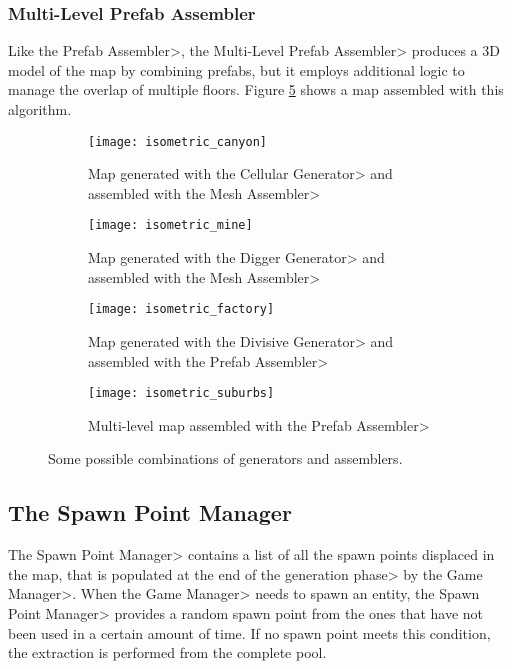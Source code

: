 
\subsubsection{Multi-Level Prefab Assembler}

Like the \<Prefab Assembler>, the \<Multi-Level Prefab Assembler> produces a 3D model of the map by combining prefabs, but it employs additional logic to manage the overlap of multiple floors. Figure \ref{fig:multi_assembled} shows a map assembled with this algorithm.

\begin{figure}
\centering
\begin{subfigure}[t]{0.48\linewidth}
\texttt{[image: isometric\_canyon]}
\caption{Map generated with the \<Cellular Generator> and assembled with the \<Mesh Assembler>}
\label{fig:cellular_assembled}
\end{subfigure}
\hfill
\begin{subfigure}[t]{0.48\linewidth}
\texttt{[image: isometric\_mine]}
\caption{Map generated with the \<Digger Generator> and assembled with the \<Mesh Assembler>}
\label{fig:digger_assembled}
\end{subfigure}

\begin{subfigure}[t]{0.48\linewidth}
\texttt{[image: isometric\_factory]}
\caption{Map generated with the \<Divisive Generator> and assembled with the \<Prefab Assembler>}
\label{fig:divisive_assembled}
\end{subfigure}
\hfill
\begin{subfigure}[t]{0.48\linewidth}
\texttt{[image: isometric\_suburbs]}
\caption{Multi-level map assembled with the \<Prefab Assembler>}
\label{fig:multi_assembled}
\end{subfigure}
\caption{Some possible combinations of generators and assemblers.}
\end{figure}


\subsection{The Spawn Point Manager}

The \<Spawn Point Manager> contains a list of all the spawn points displaced in the map, that is populated at the end of the \<generation phase> by the \<Game Manager>. When the \<Game Manager> needs to spawn an entity, the \<Spawn Point Manager> provides a random spawn point from the ones that have not been used in a certain amount of time. If no spawn point meets this condition, the extraction is performed from the complete pool.

